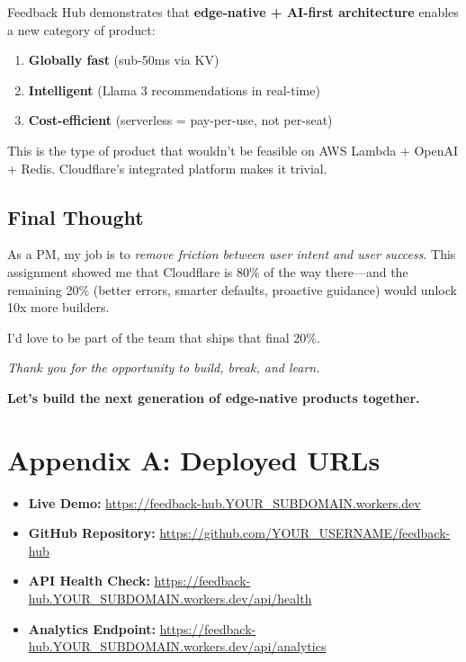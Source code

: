 \documentclass[11pt,a4paper]{article}
\begin{document}
Feedback Hub demonstrates that \textbf{edge-native + AI-first architecture} enables a new category of product:
\begin{enumerate}
    \item \textbf{Globally fast} (sub-50ms via KV)
    \item \textbf{Intelligent} (Llama 3 recommendations in real-time)
    \item \textbf{Cost-efficient} (serverless = pay-per-use, not per-seat)
\end{enumerate}

This is the type of product that wouldn't be feasible on AWS Lambda + OpenAI + Redis. Cloudflare's integrated platform makes it trivial.

\subsection{Final Thought}

As a PM, my job is to \textit{remove friction between user intent and user success}. This assignment showed me that Cloudflare is 80\% of the way there—and the remaining 20\% (better errors, smarter defaults, proactive guidance) would unlock 10x more builders.

I'd love to be part of the team that ships that final 20\%.

\vspace{2cm}

\begin{center}
\textit{Thank you for the opportunity to build, break, and learn.}

\vspace{0.5cm}

\textcolor{cfOrange}{\textbf{Let's build the next generation of edge-native products together.}}
\end{center}

\newpage

\section*{Appendix A: Deployed URLs}

\begin{itemize}[leftmargin=*, itemsep=0.5em]
    \item \textbf{Live Demo:} \url{https://feedback-hub.YOUR_SUBDOMAIN.workers.dev}
    \item \textbf{GitHub Repository:} \url{https://github.com/YOUR_USERNAME/feedback-hub}
    \item \textbf{API Health Check:} \url{https://feedback-hub.YOUR_SUBDOMAIN.workers.dev/api/health}
    \item \textbf{Analytics Endpoint:} \url{https://feedback-hub.YOUR_SUBDOMAIN.workers.dev/api/analytics}
\end{itemize}
\end{document}
